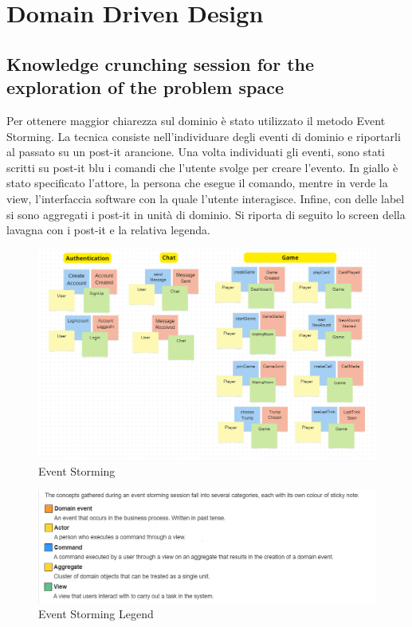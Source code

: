 \chapter{Domain Driven Design}
\label{ch:ddd} %

\section{Knowledge crunching session for the exploration of the problem space}
Per ottenere maggior chiarezza sul dominio è stato utilizzato il metodo Event Storming. 
La tecnica consiste nell'individuare degli eventi di dominio e riportarli al passato su un post-it arancione.
Una volta individuati gli eventi, sono stati scritti su post-it blu i comandi che l'utente svolge per creare l'evento.
In giallo è stato specificato l'attore, la persona che esegue il comando, mentre in verde la view, l'interfaccia software
 con la quale l'utente interagisce.
 Infine, con delle label si sono aggregati i post-it in unità di dominio.
 Si riporta di seguito lo screen della lavagna con i post-it e la relativa legenda.
 \begin{figure}[h!]
    \centering 
    \includegraphics[scale=0.45]{report/img/EventStorming.png}
    \caption{Event Storming}
    \label{event_storming}
\end{figure}

\begin{figure}[h!]
    \centering 
    \includegraphics[scale=0.60]{report/img/event_storming_legend.png}
    \caption{Event Storming Legend}
    \label{legend}
\end{figure}

